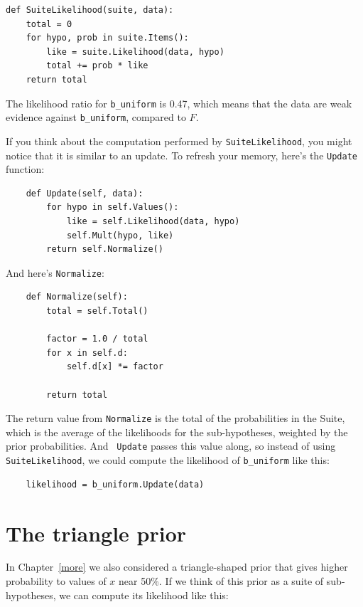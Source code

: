 \documentclass[12pt]{book}
\begin{document}
\begin{verbatim}
def SuiteLikelihood(suite, data):
    total = 0
    for hypo, prob in suite.Items():
        like = suite.Likelihood(data, hypo)
        total += prob * like
    return total
\end{verbatim}

The likelihood ratio for \verb"b_uniform" is 0.47, which means
that the data are weak evidence against \verb"b_uniform",
compared to $F$.

If you think about the computation performed by
\verb"SuiteLikelihood", you might notice that it is similar to an
update.  To refresh your memory, here's the {\tt Update} function:

\begin{verbatim}
    def Update(self, data):
        for hypo in self.Values():
            like = self.Likelihood(data, hypo)
            self.Mult(hypo, like)
        return self.Normalize()
\end{verbatim}

And here's {\tt Normalize}:

\begin{verbatim}
    def Normalize(self):
        total = self.Total()
        
        factor = 1.0 / total
        for x in self.d:
            self.d[x] *= factor

        return total
\end{verbatim}

The return value from {\tt Normalize} is the total of the
probabilities in the Suite, which is the average of the likelihoods
for the sub-hypotheses, weighted by the prior probabilities.  And {\tt
  Update} passes this value along, so instead of using {\tt
  SuiteLikelihood}, we could compute the likelihood of
\verb"b_uniform" like this:

\begin{verbatim}
    likelihood = b_uniform.Update(data)
\end{verbatim}



\section{The triangle prior}

In Chapter~\ref{more} we also considered a triangle-shaped prior that
gives higher probability to values of $x$ near 50\%.  If we think of
this prior as a suite of sub-hypotheses, we can compute its likelihood
like this:
\end{document}
